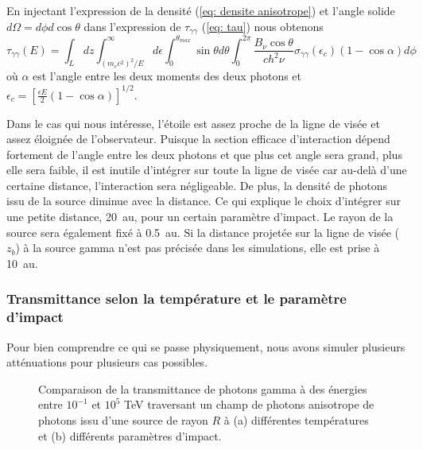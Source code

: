 \documentclass[a4paper,12pt,twoside]{article}
\begin{document}
En injectant l'expression de la densité (\ref{eq: densite anisotrope}) et l'angle solide $d \Omega = d\phi d\cos\theta$ dans l'expression de $\tau_{\gamma \gamma}$ (\ref{eq: tau}) nous obtenons
\begin{equation}
	\tau_{\gamma \gamma} (E) = \int_L d z \int_{(m_e c^2)^2/E}^{\infty} d \epsilon \int_0^{\theta_{max}} \sin\theta d \theta \int_0^{2\pi} \frac{B_\nu \cos\theta}{c h^2 \nu} \sigma_{\gamma \gamma}(\epsilon_c) (1 - \cos\alpha) d \phi
\end{equation}
où $\alpha$ est l'angle entre les deux moments des deux photons et $\epsilon_c = \left[\frac{\epsilon E}{2} (1 - \cos\alpha)\right]^{1/2}$.

Dans le cas qui nous intéresse, l'étoile est assez proche de la ligne de visée et assez éloignée de l'observateur. Puisque la section efficace d'interaction dépend fortement de l'angle entre les deux photons et que plus cet angle sera grand, plus elle sera faible, il est inutile d'intégrer sur toute la ligne de visée car au-delà d'une certaine distance, l'interaction sera négligeable. De plus, la densité de photons issu de la source diminue avec la distance. Ce qui explique le choix d'intégrer sur une petite distance, \SI{20}{\astronomicalunit}, pour un certain paramètre d'impact. Le rayon de la source sera également fixé à \SI{0.5}{\astronomicalunit}. Si la distance projetée sur la ligne de visée ($z_b$) à la source gamma n'est pas précisée dans les simulations, elle est prise à \SI{10}{\astronomicalunit}.

\subsubsection{Transmittance selon la température et le paramètre d'impact}

Pour bien comprendre ce qui se passe physiquement, nous avons simuler plusieurs atténuations pour plusieurs cas possibles.

\begin{figure}[H]
	\centering
    \hfill
    \hfill
    \caption{Comparaison de la transmittance de photons gamma à des énergies entre $10^{-1}$ et $10^5$ \si{\TeV} traversant un champ de photons anisotrope de photons issu d'une source de rayon $R$ à (a) différentes températures et (b) différents paramètres d'impact.}
\end{figure}
\end{document}

